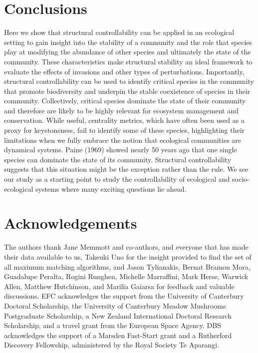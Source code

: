 \documentclass[a4paper]{artikel1}
\theoremstyle{definition}
\theoremstyle{definition}
\theoremstyle{definition}
\theoremstyle{remark}
\begin{document}
\section{Conclusions}\label{conclusions}

Here we show that structural controllability can be applied in an
ecological setting to gain insight into the stability of a community and
the role that species play at modifying the abundance of other species
and ultimately the state of the community. These characteristics make
structural stability an ideal framework to evaluate the effects of
invasions and other types of perturbations. Importantly, structural
controllability can be used to identify critical species in the
community that promote biodiversity and underpin the stable coexistence
of species in their community. Collectively, critical species dominate
the state of their community and therefore are likely to be highly
relevant for ecosystem management and conservation. While useful,
centrality metrics, which have often been used as a proxy for
keystoneness, fail to identify some of these species, highlighting their
limitations when we fully embrace the notion that ecological communities
are dynamical systems. Paine (1969) showed nearly 50 years ago that one
single species can dominate the state of its community. Structural
controllability suggests that this situation might be the exception
rather than the rule. We see our study as a starting point to study the
controllability of ecological and socio-ecological systems where many
exciting questions lie ahead.

\section{Acknowledgements}\label{acknowledgements}

The authors thank Jane Memmott and co-authors, and everyone that has
made their data available to us, Takeuki Uno for the insight provided to
find the set of all maximum matching algorithms, and Jason Tylianakis,
Bernat Bramon Mora, Guadalupe Peralta, Rogini Runghen, Michelle
Marraffini, Mark Herse, Warwick Allen, Matthew Hutchinson, and Marilia
Gaiarsa for feedback and valuable discussions. EFC acknowledges the
support from the University of Canterbury Doctoral Scholarship, the
University of Canterbury Meadow Mushrooms Postgraduate Scholarship, a
New Zealand International Doctoral Research Scholarship, and a travel
grant from the European Space Agency. DBS acknowledges the support of a
Marsden Fast-Start grant and a Rutherford Discovery Fellowship,
administered by the Royal Society Te Aparangi.
\end{document}
